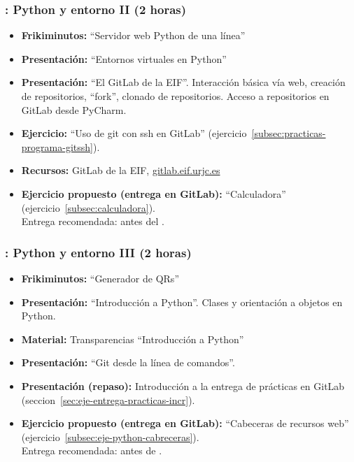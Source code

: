\documentclass[a4paper,12pt]{article}
\begin{document}
\subsubsection{\juevesB: Python y entorno II  (2 horas)}
\label{cal:juevesB}

\begin{itemize}
\item \textbf{Frikiminutos:} ``Servidor web Python de una línea''
\item \textbf{Presentación:} ``Entornos virtuales en Python''
\item \textbf{Presentación:} ``El GitLab de la EIF''. Interacción básica vía web, creación de repositorios, ``fork'', clonado de repositorios. Acceso a repositorios en GitLab desde PyCharm.
\item \textbf{Ejercicio:} ``Uso de git con ssh en GitLab'' (ejercicio~\ref{subsec:practicas-programa-gitssh}).
\item \textbf{Recursos:} GitLab de la EIF, \url{gitlab.eif.urjc.es}
\item \textbf{Ejercicio propuesto (entrega en GitLab):} ``Calculadora'' (ejercicio~\ref{subsec:calculadora}). \\
  Entrega recomendada: antes del \juevesC.
\end{itemize}

\subsubsection{\juevesC: Python y entorno III  (2 horas)}
\label{cal:juevesC}

\begin{itemize}
\item \textbf{Frikiminutos:} ``Generador de QRs''
\item \textbf{Presentación:} ``Introducción a Python''. Clases y orientación a objetos en Python.
\item \textbf{Material:} Transparencias ``Introducción a Python''
\item \textbf{Presentación:} ``Git desde la línea de comandos''.
\item \textbf{Presentación (repaso):} Introducción a la entrega de prácticas en GitLab (seccion~\ref{sec:eje-entrega-practicas-incr}).
\item \textbf{Ejercicio propuesto (entrega en GitLab):} ``Cabeceras de recursos web'' (ejercicio~\ref{subsec:eje-python-cabreceras}). \\
Entrega recomendada: antes de \juevesD.
\end{itemize}
\end{document}
